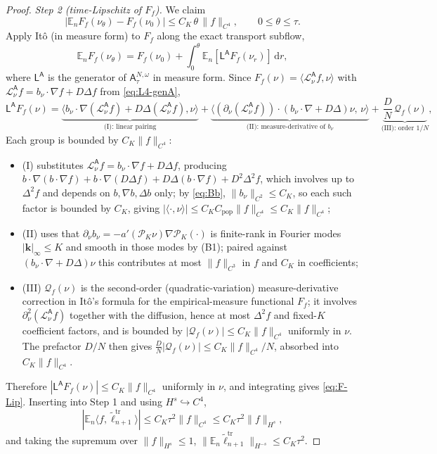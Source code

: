 \documentclass[a4paper,fleqn]{cas-sc}
\theoremstyle{definition}
\theoremstyle{remark}
\begin{document}
\begin{proof}
\emph{Step 2 (time-Lipschitz of $F_f$).} We claim
\begin{equation}\label{eq:F-Lip}
|\mathbb E_nF_f(\nu_\theta)-F_f(\nu_0)|\le C_K\,\theta\,\|f\|_{C^4},
\qquad 0\le\theta\le\tau.
\end{equation}
Apply It\^o (in measure form) to $F_f$ along the exact transport subflow,
\[
\mathbb E_nF_f(\nu_\theta)=F_f(\nu_0)+\int_0^\theta\mathbb E_n[\mathsf L^{\mathsf A}F_f(\nu_r)]\,\mathrm dr,
\]
where $\mathsf L^{\mathsf A}$ is the generator of $\mathsf A^{N,\omega}_\tau$ in
measure form. Since $F_f(\nu)=\langle \mathcal L^{\mathsf A}_\nu f,\nu\rangle$ with
$\mathcal L^{\mathsf A}_\nu f=b_\nu\!\cdot\!\nabla f+D\Delta f$ from \eqref{eq:L4-genA},
\[
\mathsf L^{\mathsf A} F_f(\nu)
=\underbrace{\langle b_\nu\!\cdot\!\nabla(\mathcal L^{\mathsf A}_\nu f)+D\Delta(\mathcal L^{\mathsf A}_\nu f),\nu\rangle}_{\text{(I): linear pairing}}
+\underbrace{\bigl\langle(\partial_\nu(\mathcal L^{\mathsf A}_\nu f))\cdot(b_\nu\!\cdot\!\nabla\!+\!D\Delta)\nu,\,\nu\bigr\rangle}_{\text{(II): measure-derivative of }b_\nu}
+\underbrace{\frac{D}{N}\,\mathcal Q_f(\nu)}_{\text{(III): order $1/N$}},
\]
Each group is bounded by $C_K\|f\|_{C^4}$:
\begin{itemize}
\item (I) substitutes $\mathcal L^{\mathsf A}_\nu f=b_\nu\!\cdot\!\nabla f+D\Delta f$, producing
$b\!\cdot\!\nabla(b\!\cdot\!\nabla f)+b\!\cdot\!\nabla(D\Delta f)+D\Delta(b\!\cdot\!\nabla f)+D^2\Delta^2f$,
which involves up to $\Delta^2f$ and depends on $b,\nabla b,\Delta b$ only;
by \eqref{eq:Bb}, $\|b_\nu\|_{C^2}\le C_K$, so each such factor is bounded by $C_K$,
giving $|\langle\cdot,\nu\rangle|\le C_K C_{\mathrm{pop}}\|f\|_{C^4}\le C_K\|f\|_{C^4}$;
\item (II) uses that $\partial_\nu b_\nu=-a'(\mathcal P_K\nu)\nabla\mathcal P_K(\cdot)$
is finite-rank in Fourier modes $|\mathbf k|_\infty\le K$ and smooth in those modes
by (B1); paired against $(b_\nu\!\cdot\!\nabla+D\Delta)\nu$ this contributes at
most $\|f\|_{C^3}$ in $f$ and $C_K$ in coefficients;
\item (III) $\mathcal Q_f(\nu)$ is the second-order (quadratic-variation)
measure-derivative correction in It\^o's formula for the empirical-measure
functional $F_f$; it involves $\partial_\nu^2(\mathcal L^{\mathsf A}_\nu f)$ together with the diffusion,
hence at most $\Delta^2 f$ and fixed-$K$ coefficient factors, and is bounded by
$|\mathcal Q_f(\nu)|\le C_K\|f\|_{C^4}$ uniformly in $\nu$. The prefactor $D/N$
then gives $\frac{D}{N}|\mathcal Q_f(\nu)|\le C_K\|f\|_{C^4}/N$, absorbed into
$C_K\|f\|_{C^4}$.
\end{itemize}
Therefore $|\mathsf L^{\mathsf A} F_f(\nu)|\le C_K\|f\|_{C^4}$ uniformly in
$\nu$, and integrating gives \eqref{eq:F-Lip}. Inserting into Step 1 and using
$H^s\hookrightarrow C^4$,
\[
|\mathbb E_n\langle f,\widetilde\ell^{\mathrm{tr}}_{n+1}\rangle|\le C_K\tau^2\|f\|_{C^4}\le C_K\tau^2\|f\|_{H^s},
\]
and taking the supremum over $\|f\|_{H^s}\le1$,
$\|\mathbb E_n\widetilde\ell^{\mathrm{tr}}_{n+1}\|_{H^{-s}}\le C_K\tau^2$.


\end{proof}
\end{document}
